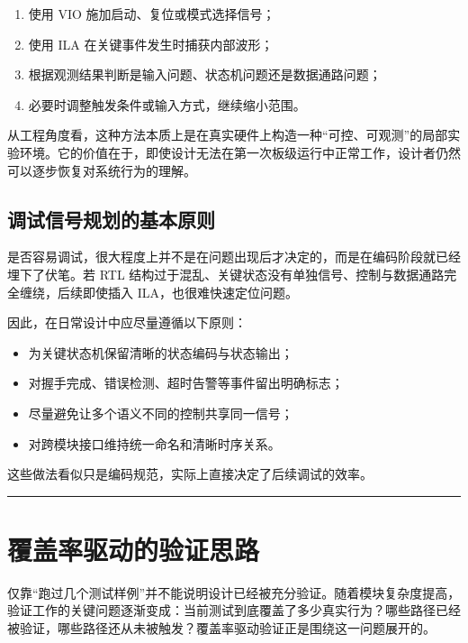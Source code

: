 \begin{enumerate}
\def\labelenumi{\arabic{enumi}.}
\tightlist
\item
  使用 VIO 施加启动、复位或模式选择信号；
\item
  使用 ILA 在关键事件发生时捕获内部波形；
\item
  根据观测结果判断是输入问题、状态机问题还是数据通路问题；
\item
  必要时调整触发条件或输入方式，继续缩小范围。
\end{enumerate}

从工程角度看，这种方法本质上是在真实硬件上构造一种``可控、可观测''的局部实验环境。它的价值在于，即使设计无法在第一次板级运行中正常工作，设计者仍然可以逐步恢复对系统行为的理解。

\subsection{调试信号规划的基本原则}\label{ux8c03ux8bd5ux4fe1ux53f7ux89c4ux5212ux7684ux57faux672cux539fux5219}

是否容易调试，很大程度上并不是在问题出现后才决定的，而是在编码阶段就已经埋下了伏笔。若
RTL
结构过于混乱、关键状态没有单独信号、控制与数据通路完全缠绕，后续即使插入
ILA，也很难快速定位问题。

因此，在日常设计中应尽量遵循以下原则：

\begin{itemize}
\tightlist
\item
  为关键状态机保留清晰的状态编码与状态输出；
\item
  对握手完成、错误检测、超时告警等事件留出明确标志；
\item
  尽量避免让多个语义不同的控制共享同一信号；
\item
  对跨模块接口维持统一命名和清晰时序关系。
\end{itemize}

这些做法看似只是编码规范，实际上直接决定了后续调试的效率。

\begin{center}\rule{0.5\linewidth}{0.5pt}\end{center}

\section{覆盖率驱动的验证思路}\label{ux8986ux76d6ux7387ux9a71ux52a8ux7684ux9a8cux8bc1ux601dux8def}

仅靠``跑过几个测试样例''并不能说明设计已经被充分验证。随着模块复杂度提高，验证工作的关键问题逐渐变成：当前测试到底覆盖了多少真实行为？哪些路径已经被验证，哪些路径还从未被触发？覆盖率驱动验证正是围绕这一问题展开的。

